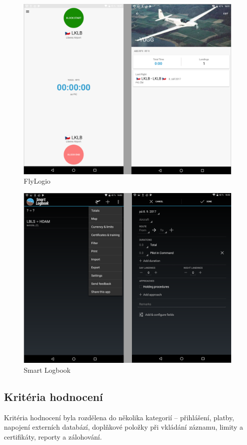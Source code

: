 \documentclass[thesis=M,czech]{FITthesis}[2012/06/26]
\begin{document}
\begin{figure}[]\centering
 \includegraphics[width=0.99\textwidth]{./pictures/existujiciAplikace/FlyLogio}
 \caption[FlyLogio]{FlyLogio}\label{fig:FlyLogio}
\end{figure}

\begin{figure}[]\centering
 \includegraphics[width=0.99\textwidth]{./pictures/existujiciAplikace/SmartLogbook}
 \caption[Smart Logbook]{Smart Logbook}\label{fig:LogTenProX}
\end{figure}

\subsection{Kritéria hodnocení}
Kritéria hodnocení byla rozdělena do několika kategorií -- přihlášení, platby, napojení externích databází, doplňkové položky při vkládání záznamu, limity a certifikáty, reporty a zálohování.	
\end{document}
